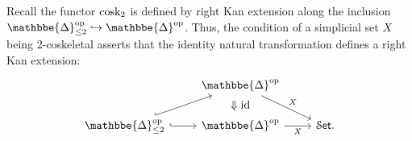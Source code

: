 \documentclass[a4paper,UKenglish,cleveref, autoref, thm-restate]{lipics-v2021}
\newcommand{\op}{\textup{op}}
\newcommand{\id}{\textup{id}}
\newcommand{\cosk}{\textup{cosk}}
\newcommand{\nerve}{\textup{nerve}}
\newcommand{\cat}[1]{\textup{\textsf{#1}}}%
\newcommand{\1}{\mathbbe{1}}
\newcommand{\2}{\mathbbe{2}}
\newcommand{\3}{\mathbbe{3}}
\newcommand{\DDelta}{\mathbbe{\Delta}}
\newcommand{\Cat}{\mathcal{C}\cat{at}}
\newcommand{\Set}{\mathcal{S}\cat{et}}
\begin{document}

Recall the functor $\cosk_2$ is defined by right Kan extension along the inclusion $\DDelta_{\leq 2}^\op \hookrightarrow \DDelta^\op$. Thus, the condition of a simplicial set $X$ being 2-coskeletal asserts that the identity natural transformation defines a right Kan extension:
\begin{equation}\label{eq:cosk-kan-ext} \begin{tikzcd} & \DDelta^\op \arrow[dr, "X"] \arrow[d, phantom, "\Downarrow\id"]\\ \DDelta_{\leq 2}^\op \arrow[ur, hook] \arrow[r, hook] & \DDelta^\op \arrow[r, "X"'] & \Set. \end{tikzcd}
\end{equation}
\end{document}
